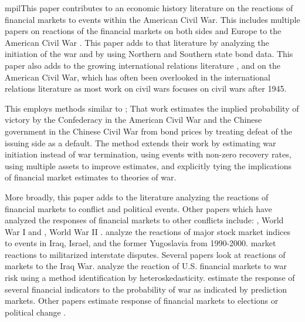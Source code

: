mpilThis paper contributes to an economic history literature on the reactions of financial markets to events within the American Civil War.
This includes multiple papers on reactions of the financial markets on both sides and Europe to the American Civil War \parencites{Schwab1901}{Mitchell1903}{WillardGuinnaneEtAl1996}{McCandless1996}{SmithSmith1997}{BrownBurdekin2000}{Weidenmier2002}.
This paper adds to that literature by analyzing the initiation of the war and by using Northern and Southern state bond data.
This paper also adds to the growing international relations literature \textcite{Poast2012}, and \textcite{Reiter2009} on the American Civil War, which has often been overlooked in the international relations literature as most work on civil wars focuses on civil wars after 1945.

This employs methods similar to \textcite{HaberMitchenerOosterlinckEtAl2015};
That work estimates the implied probability of victory by the Confederacy in the American Civil War and the Chinese government in the Chinese Civil War from bond prices by treating defeat of the issuing side as a default.
The method extends their work by estimating war initiation instead of war termination, using events with non-zero recovery rates, using multiple assets to improve estimates, and explicitly tying the implications of financial market estimates to theories of war.

More broadly, this paper adds to the literature analyzing the reactions of financial markets to conflict and political events.
Other papers which have analyzed the responses of financial markets to other conflicts include:  \textcite{Bueno1990}, World War I \textcite{Hall2004} and \textcite{Ferguson2006}, World War II \textcites{WaldenstromFrey2008}{WaldenstromFrey2008}.
\textcite{SchneiderTroeger2006} analyze the reactions of major stock market indices to events in Iraq, Israel, and the former Yugoslavia from 1990-2000.
\textcite{GuidolinLaFerrara2010} market reactions to militarized interstate disputes.
Several papers look at reactions of markets to the Iraq War.
\textcite{RigobonSack2005} analyze the reaction of U.S. financial markets to war risk using a method identification by heteroskedasticity.
\textcites{LeighWolfersEtAl2003}{WolfersZitzewitz2009} estimate the response of several financial indicators to the probability of war as indicated by prediction markets.
Other papers estimate response of financial markets to elections or political change \parencites{Jayachandr2006}{Herron2000}.



